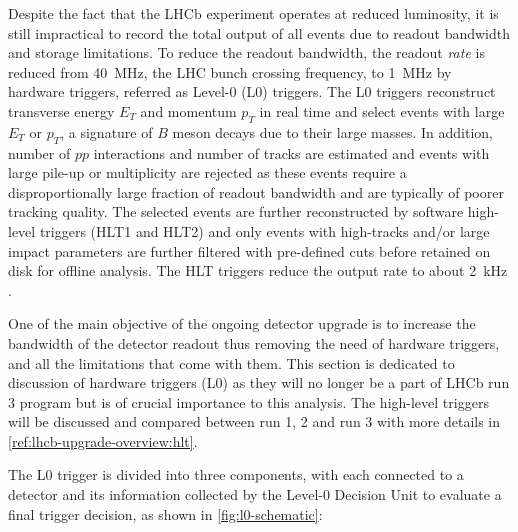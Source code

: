 Despite the fact that the LHCb experiment operates at reduced luminosity,
it is still impractical to record the total output of all events due to readout
bandwidth and storage limitations.
To reduce the readout bandwidth,
the readout \emph{rate} is reduced from 40~MHz,
the LHC bunch crossing frequency,
to 1~MHz by hardware triggers,
referred as Level-0 (L0) triggers.
The L0 triggers reconstruct transverse energy $E_T$ and momentum $p_T$ in real
time and select events with large $E_T$ or $p_T$,
a signature of $B$ meson decays due to their large masses.
In addition, number of $pp$ interactions and number of tracks are estimated and
events with large pile-up or multiplicity are rejected
as these events require a disproportionally large fraction of readout bandwidth
and are typically of poorer tracking quality.
The selected events are further reconstructed by software high-level
triggers (HLT1 and HLT2) and only events with high-\pt tracks and/or large
impact parameters are further filtered with pre-defined cuts before retained on
disk for offline analysis.
The HLT triggers reduce the output rate to about 2~kHz
\cite{The_LHCb_Collaboration_2008}.

One of the main objective of the ongoing detector upgrade is to increase the
bandwidth of the detector readout thus removing the need of hardware triggers,
and all the limitations that come with them.
This section is dedicated to discussion of hardware triggers (L0) as they
will no longer be a part of LHCb run 3 program but is of crucial importance to
this analysis.
The high-level triggers will be discussed and compared between run 1, 2 and run
3 with more details in \cref{ref:lhcb-upgrade-overview:hlt}.

The L0 trigger is divided into three components, with each connected to a
detector and its information collected by the Level-0 Decision Unit to evaluate
a final trigger decision, as shown in \cref{fig:l0-schematic}:

